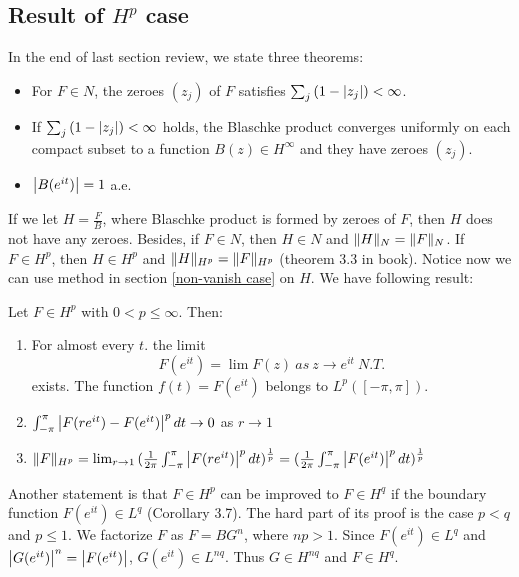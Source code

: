\subsection{Result of $H^p$ case}
In the end of last section review, we state three theorems:
\begin{itemize}
    \item For $F\in N$, the zeroes $(z_j)$ of $F$ satisfies $\sum_j{(1-\left\lvert z_j\right\rvert)<\infty}$.
    \item If $\sum_j{(1-\left\lvert z_j\right\rvert)<\infty}$ holds, the Blaschke product converges uniformly on each compact subset to a function $B(z)\in H^\infty$ and they have zeroes $(z_j)$.
    \item $\left\lvert B(e^{it})\right\rvert=1$ a.e.
\end{itemize}
If we let $H=\frac{F}{B}$, where Blaschke product is formed by zeroes of $F$, then $H$ does not have any zeroes. Besides,
if $F\in N$, then $H\in N$ and  $\lVert H\rVert_N=\lVert F\rVert_N$. If $F\in H^p$, then $H\in H^p$ and  $\lVert H\rVert_{H^p}=\lVert F\rVert_{H^p}$ (theorem 3.3 in book). Notice now we can use method in section \ref{non-vanish case} on $H$. We have following result:
\begin{theorem}
    Let $F\in H^p$ with $0<p\leq \infty$. Then:
    \begin{enumerate}
        \item For almost every $t$. the limit
              \begin{equation*}
                  F(e^{it})=\lim{F(z)}~as~z\to e^{it}~N.T.
              \end{equation*}
              exists. The function $f(t)=F(e^{it})$ belongs to $L^p([-\pi,\pi])$.
        \item  $\int_{-\pi}^\pi{\left\lvert F(re^{it})-F(e^{it})\right\rvert^p d t} \to 0$ as $r\to 1$

        \item $\lVert F\rVert_{H^p}=\lim_{r\to 1}{(\frac{1}{2\pi}\int_{-\pi}^\pi{\left\lvert F(re^{it})\right\rvert^p d t})^\frac{1}{p}}=(\frac{1}{2\pi}\int_{-\pi}^\pi{\left\lvert F(e^{it})\right\rvert^p d t})^\frac{1}{p}$

    \end{enumerate}
\end{theorem}
Another statement is that $F\in H^p$ can be improved to $F\in H^q$ if the boundary function $F(e^{it})\in L^q$ (Corollary 3.7). The hard part of its proof
is the case $p<q$ and $p\leq 1$. We factorize $F$ as $F=BG^n$, where $np>1$. Since $F(e^{it}) \in L^{q}$ and
$\left\lvert G(e^{it})\right\rvert^n=\left\lvert F(e^{it})\right\rvert$, $G(e^{it})\in L^{nq}$. Thus $G\in H^{nq}$ and $F\in H^q$.\par
